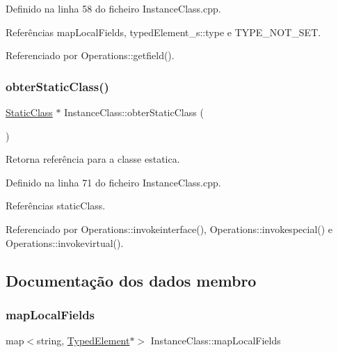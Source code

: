 Definido na linha 58 do ficheiro Instance\+Class.\+cpp.



Referências map\+Local\+Fields, typed\+Element\+\_\+s\+::type e T\+Y\+P\+E\+\_\+\+N\+O\+T\+\_\+\+S\+ET.



Referenciado por Operations\+::getfield().

\mbox{\label{classInstanceClass_a6da567a64a8373d609792821f5acb9a3}} 
\subsubsection{\texorpdfstring{obter\+Static\+Class()}{obterStaticClass()}}
{\footnotesize\ttfamily \hyperlink{classStaticClass}{Static\+Class} $\ast$ Instance\+Class\+::obter\+Static\+Class (\begin{DoxyParamCaption}{ }\end{DoxyParamCaption})}



Retorna referência para a classe estatica. 



Definido na linha 71 do ficheiro Instance\+Class.\+cpp.



Referências static\+Class.



Referenciado por Operations\+::invokeinterface(), Operations\+::invokespecial() e Operations\+::invokevirtual().



\subsection{Documentação dos dados membro}
\mbox{\label{classInstanceClass_a455e05eefc1273e6cf22607c8941e9c0}} 
\subsubsection{\texorpdfstring{map\+Local\+Fields}{mapLocalFields}}
{\footnotesize\ttfamily map$<$string, \hyperlink{BasicTypes_8h_a97b332303b1262282599e6ede0637b82}{Typed\+Element}$\ast$$>$ Instance\+Class\+::map\+Local\+Fields\hspace{0.3cm}{\ttfamily [private]}}



